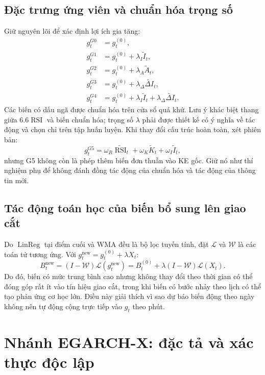 \documentclass[12pt,a4paper,oneside]{article}
\newcommand{\LinReg}{\operatorname{LinReg}}
\newcommand{\RSI}{\operatorname{RSI}}
\begin{document}
\subsection{Đặc trưng ứng viên và chuẩn hóa trọng số}
Giữ nguyên lõi để xác định lợi ích gia tăng:
\begin{align}
g_t^{G0}&=g_t^{(0)},\\
g_t^{G1}&=g_t^{(0)}+\lambda_I\widetilde I_t,\\
g_t^{G2}&=g_t^{(0)}+\lambda_A\widetilde A_t,\\
g_t^{G3}&=g_t^{(0)}+\lambda_\Delta\widetilde{\Delta I}_t,\\
g_t^{G4}&=g_t^{(0)}+\lambda_I\widetilde I_t+\lambda_\Delta\widetilde{\Delta I}_t.
\end{align}
Các biến có dấu ngã được chuẩn hóa trên cửa sổ quá khứ. Lưu ý khác biệt thang giữa $6.6\RSI$ và biến chuẩn hóa; trọng số $\lambda$ phải được thiết kế có ý nghĩa về tác động và chọn chỉ trên tập huấn luyện. Khi thay đổi cấu trúc hoàn toàn, xét phiên bản:
\begin{equation}
g_t^{G5}=\omega_R\widetilde{\RSI}_t+\omega_K\widetilde K_t+\omega_I\widetilde I_t,
\end{equation}
nhưng G5 không còn là phép thêm biến đơn thuần vào KE gốc. Giữ nó như thí nghiệm phụ để không đánh đồng tác động của chuẩn hóa và tác động của thông tin mới.

\subsection{Tác động toán học của biến bổ sung lên giao cắt}
Do $\LinReg$ tại điểm cuối và WMA đều là bộ lọc tuyến tính, đặt $\mathcal L$ và $\mathcal W$ là các toán tử tương ứng. Với $g_t^{\mathrm{new}}=g_t^{(0)}+\lambda X_t$:
\begin{equation}\label{eq:linearadd}
B_t^{\mathrm{new}}=(I-\mathcal W)\mathcal L(g_t^{\mathrm{new}})
=B_t^{(0)}+\lambda (I-\mathcal W)\mathcal L(X_t).
\end{equation}
Do đó, biến có mức trung bình cao nhưng không thay đổi theo thời gian có thể đóng góp rất ít vào tín hiệu giao cắt, trong khi biến có bước nhảy theo lịch có thể tạo phản ứng cơ học lớn. Điều này giải thích vì sao dự báo biến động theo ngày không nên tự động cộng trực tiếp vào $g_t$ theo phút.

\section{Nhánh EGARCH-X: đặc tả và xác thực độc lập}
\end{document}
